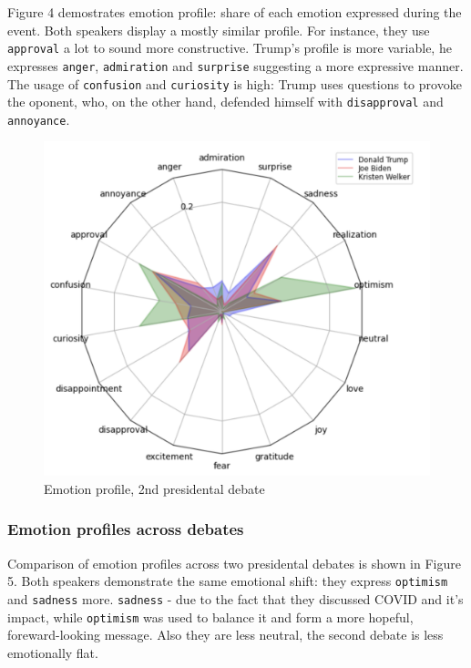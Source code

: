 \documentclass[pdflatex,sn-mathphys-num]{sn-jnl}%
\begin{document}
Figure 4 demostrates emotion profile: share of each emotion expressed during the event.
Both speakers display a mostly similar profile. For instance, they use \texttt{approval} a lot to sound more constructive.
Trump's profile is more variable, he expresses \texttt{anger}, \texttt{admiration} and \texttt{surprise} suggesting a more expressive manner. The usage of \texttt{confusion} and \texttt{curiosity} is high: Trump uses questions to provoke the oponent, who, on the other hand, defended himself with \texttt{disapproval} and \texttt{annoyance}. 

\begin{figure}[h]
	\centering
	\includegraphics[width=14cm]{f4-emotion_profile.png}
	\caption{Emotion profile, 2nd presidental debate}
\end{figure}

\newpage
\subsubsection{Emotion profiles across debates}


Comparison of emotion profiles across two presidental debates is shown in Figure 5.
Both speakers demonstrate the same emotional shift: they express \texttt{optimism} and \texttt{sadness} more. \texttt{sadness} - due to the fact that they discussed COVID and it's impact, while \texttt{optimism} was used to balance it and form a more hopeful, foreward-looking message. Also they are less neutral, the second debate is less emotionally flat.
\end{document}
